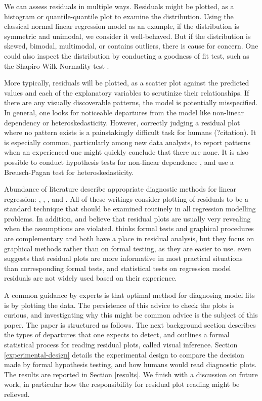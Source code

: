 \documentclass[]{interact}
\theoremstyle{plain}%
\theoremstyle{definition}
\theoremstyle{remark}
\begin{document}
We can assess residuals in multiple ways. Residuals might be plotted, as
a histogram or quantile-quantile plot to examine the distribution. Using
the classical normal linear regression model as an example, if the
distribution is symmetric and unimodal, we consider it well-behaved. But
if the distribution is skewed, bimodal, multimodal, or contains
outliers, there is cause for concern. One could also inspect the
distribution by conducting a goodness of fit test, such as the
Shapiro-Wilk Normality test \citep{shapiro1965analysis}.

More typically, residuals will be plotted, as a scatter plot against the
predicted values and each of the explanatory variables to scrutinize
their relationships. If there are any visually discoverable patterns,
the model is potentially misspecified. In general, one looks for
noticeable departures from the model like non-linear dependency or
heteroskedasticity. However, correctly judging a residual plot where no
pattern exists is a painstakingly difficult task for humans (?citation).
It is especially common, particularly among new data analysts, to report
patterns when an experienced one might quickly conclude that there are
none. It is also possible to conduct hypothesis tests for non-linear
dependence \citep{ramsey_tests_1969}, and use a Breusch-Pagan test
\citep{breusch_simple_1979} for heteroskedasticity.

Abundance of literature describe appropriate diagnostic methods for
linear regression: \citet{draper1998applied},
\citet{montgomery1982introduction}, \citet{belsley_regression_1980},
\citet{cook_applied_1999} and \citet{cook1982residuals}. All of these
writings consider plotting of residuals to be a standard technique that
should be examined routinely in all regression modelling problems. In
addition, \citet{draper1998applied} and \citet{belsley_regression_1980}
believe that residual plots are usually very revealing when the
assumptions are violated. \citet{cook_applied_1999} thinks formal tests
and graphical procedures are complementary and both have a place in
residual analysis, but they focus on graphical methods rather than on
formal testing, as they are easier to use.
\citet{montgomery1982introduction} even suggests that residual plots are
more informative in most practical situations than corresponding formal
tests, and statistical tests on regression model residuals are not
widely used based on their experience.

A common guidance by experts is that optimal method for diagnosing model
fits is by plotting the data. The persistence of this advice to check
the plots is curious, and investigating why this might be common advice
is the subject of this paper. The paper is structured as follows. The
next background section describes the types of departures that one
expects to detect, and outlines a formal statistical process for reading
residual plots, called visual inference. Section
\ref{experimental-design} details the experimental design to compare the
decision made by formal hypothesis testing, and how humans would read
diagnostic plots. The results are reported in Section \ref{results}. We
finish with a discussion on future work, in particular how the
responsibility for residual plot reading might be relieved.
\end{document}

